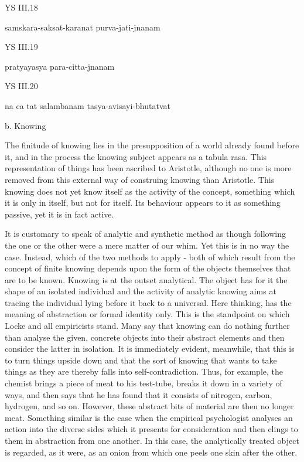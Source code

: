     YS III.18

    samskara-saksat-karanat purva-jati-jnanam

    YS III.19

    pratyayasya para-citta-jnanam

    YS III.20

    na ca tat salambanam tasya-avisayi-bhutatvat

    b. Knowing

    The finitude of knowing lies in the presupposition of a world already found before it,
    and in the process the knowing subject appears as a tabula rasa.
    This representation of things has been ascribed to Aristotle, although no one is
    more removed from this external way of construing knowing than Aristotle.
    This knowing does not yet know itself as the activity of the concept,
    something which it is only in itself, but not for itself.
    Its behaviour appears to it as something passive, yet it is in fact active.

    It is customary to speak of analytic and synthetic method as though
    following the one or the other were a mere matter of our whim. Yet this is in
    no way the case. Instead, which of the two methods to apply - both of which
    result from the concept of finite knowing depends upon the form of the objects
    themselves that are to be known. Knowing is at the outset analytical.
    The object has for it the shape of an isolated individual
    and the activity of analytic knowing aims at tracing the individual lying before
    it back to a universal. Here thinking, has the meaning of abstraction or formal
    identity only. This is the standpoint on which Locke and all empiricists stand.
    Many say that knowing can do nothing further than analyse the given, concrete
    objects into their abstract elements and then consider the latter in
    isolation. It is immediately evident, meanwhile, that this is to turn things upside
    down and that the sort of knowing that wants to take things as they are thereby
    falls into self-contradiction. Thus, for example, the chemist brings a piece of meat
    to his test-tube, breaks it down in a variety of ways, and then says that he has found
    that it consists of nitrogen, carbon, hydrogen, and so on. However, these abstract
    bits of material are then no longer meat. Something similar is the case when the
    empirical psychologist analyses an action into the diverse sides which it presents
    for consideration and then clings to them in abstraction from one another. In this
    case, the analytically treated object is regarded, as it were, as an onion
    from which one peels one skin after the other.

